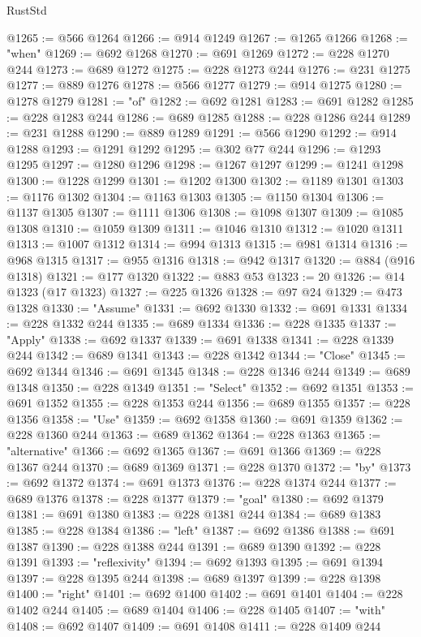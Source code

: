 \begin{lexlean}{RustStd}
\begin{coremodule}
@1265 := @566 @1264
@1266 := @914 @1249
@1267 := @1265 @1266
@1268 := "when"
@1269 := @692 @1268
@1270 := @691 @1269
@1272 := @228 @1270 @244
@1273 := @689 @1272
@1275 := @228 @1273 @244
@1276 := @231 @1275
@1277 := @889 @1276
@1278 := @566 @1277
@1279 := @914 @1275
@1280 := @1278 @1279
@1281 := "of"
@1282 := @692 @1281
@1283 := @691 @1282
@1285 := @228 @1283 @244
@1286 := @689 @1285
@1288 := @228 @1286 @244
@1289 := @231 @1288
@1290 := @889 @1289
@1291 := @566 @1290
@1292 := @914 @1288
@1293 := @1291 @1292
@1295 := @302 @77 @244
@1296 := @1293 @1295
@1297 := @1280 @1296
@1298 := @1267 @1297
@1299 := @1241 @1298
@1300 := @1228 @1299
@1301 := @1202 @1300
@1302 := @1189 @1301
@1303 := @1176 @1302
@1304 := @1163 @1303
@1305 := @1150 @1304
@1306 := @1137 @1305
@1307 := @1111 @1306
@1308 := @1098 @1307
@1309 := @1085 @1308
@1310 := @1059 @1309
@1311 := @1046 @1310
@1312 := @1020 @1311
@1313 := @1007 @1312
@1314 := @994 @1313
@1315 := @981 @1314
@1316 := @968 @1315
@1317 := @955 @1316
@1318 := @942 @1317
@1320 := @884 (@916 @1318)
@1321 := @177 @1320
@1322 := @883 @53
@1323 := 20
@1326 := @14 @1323 (@17 @1323)
@1327 := @225 @1326
@1328 := @97 @24
@1329 := @473 @1328
@1330 := "Assume"
@1331 := @692 @1330
@1332 := @691 @1331
@1334 := @228 @1332 @244
@1335 := @689 @1334
@1336 := @228 @1335
@1337 := "Apply"
@1338 := @692 @1337
@1339 := @691 @1338
@1341 := @228 @1339 @244
@1342 := @689 @1341
@1343 := @228 @1342
@1344 := "Close"
@1345 := @692 @1344
@1346 := @691 @1345
@1348 := @228 @1346 @244
@1349 := @689 @1348
@1350 := @228 @1349
@1351 := "Select"
@1352 := @692 @1351
@1353 := @691 @1352
@1355 := @228 @1353 @244
@1356 := @689 @1355
@1357 := @228 @1356
@1358 := "Use"
@1359 := @692 @1358
@1360 := @691 @1359
@1362 := @228 @1360 @244
@1363 := @689 @1362
@1364 := @228 @1363
@1365 := "alternative"
@1366 := @692 @1365
@1367 := @691 @1366
@1369 := @228 @1367 @244
@1370 := @689 @1369
@1371 := @228 @1370
@1372 := "by"
@1373 := @692 @1372
@1374 := @691 @1373
@1376 := @228 @1374 @244
@1377 := @689 @1376
@1378 := @228 @1377
@1379 := "goal"
@1380 := @692 @1379
@1381 := @691 @1380
@1383 := @228 @1381 @244
@1384 := @689 @1383
@1385 := @228 @1384
@1386 := "left"
@1387 := @692 @1386
@1388 := @691 @1387
@1390 := @228 @1388 @244
@1391 := @689 @1390
@1392 := @228 @1391
@1393 := "reflexivity"
@1394 := @692 @1393
@1395 := @691 @1394
@1397 := @228 @1395 @244
@1398 := @689 @1397
@1399 := @228 @1398
@1400 := "right"
@1401 := @692 @1400
@1402 := @691 @1401
@1404 := @228 @1402 @244
@1405 := @689 @1404
@1406 := @228 @1405
@1407 := "with"
@1408 := @692 @1407
@1409 := @691 @1408
@1411 := @228 @1409 @244

\end{coremodule}
\end{lexlean}
